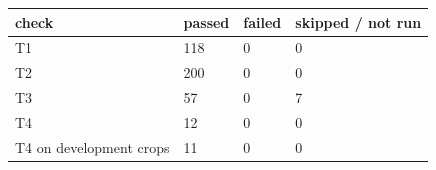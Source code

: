 \begin{tabular}{llll}
\hline
check & passed & failed & skipped / not run \\
\hline
T1 & 118 & 0 & 0 \\
T2 & 200 & 0 & 0 \\
T3 & 57 & 0 & 7 \\
T4 & 12 & 0 & 0 \\
T4 on development crops & 11 & 0 & 0 \\
\hline
\end{tabular}
